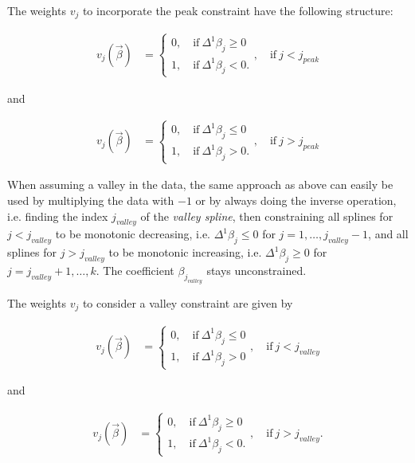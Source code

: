 \documentclass[10pt,a4paper]{report}
\begin{document}
The weights $v_j$ to incorporate the peak constraint have the following structure:

\begin{align}\label{eq:v_peak_1}
	v_j(\vec{\beta}) &= \begin{cases} 
		0, \quad \text{if} \ \Delta^1\beta_j \ge 0 \\ 
		1, \quad \text{if} \ \Delta^1\beta_j  < 0.
	\end{cases}, \quad \text{if} \ j < j_{peak}
\end{align}

and 

\begin{align}\label{eq:v_peak_2}
	v_j(\vec{\beta}) &= \begin{cases} 
		0, \quad \text{if} \ \Delta^1\beta_j \le 0 \\ 
		1, \quad \text{if} \ \Delta^1\beta_j > 0.
	\end{cases}, \quad \text{if} \ j > j_{peak}
\end{align}

When assuming a valley in the data, the same approach as above can easily be used by multiplying the data with $-1$ or by always doing the inverse operation, i.e. finding the index $j_{valley}$ of the \emph{valley spline}, then constraining all splines for $j < j_{valley}$ to be monotonic decreasing, i.e. $\Delta^1 \beta_j \le 0$ for $j = 1, \dots, j_{valley}-1$, and all splines for $j > j_{valley}$ to be monotonic increasing, i.e. $\Delta^1 \beta_j \ge 0$ for $j = j_{valley}+1, \dots, k$. The coefficient $\beta_{j_{valley}}$ stays unconstrained. 

The weights $v_j$ to consider a valley constraint are given by

\begin{align}\label{eq:v_valley_1}
	v_j(\vec{\beta}) &= \begin{cases} 
		0, \quad \text{if} \ \Delta^1\beta_j \le 0 \\ 
		1, \quad \text{if} \ \Delta^1\beta_j > 0
	\end{cases}, \quad \text{if} \ j < j_{valley}
\end{align}

and 

\begin{align}\label{eq:v_valley_2}
	v_j(\vec{\beta}) &= \begin{cases} 
		0, \quad \text{if} \ \Delta^1\beta_j \ge 0 \\ 
		1, \quad \text{if} \ \Delta^1\beta_j < 0.
	\end{cases}, \quad \text{if} \ j > j_{valley}.
\end{align}
\end{document}

